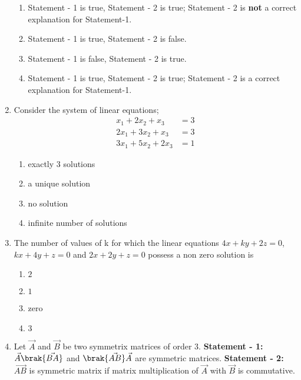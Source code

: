 \begin{enumerate}
	\hfill{}
	\begin{enumerate}
		\item Statement - 1 is true, Statement - 2 is true; Statement - 2 is \textbf{not} a correct explanation for Statement-1. 
	    	\item Statement - 1 is true, Statement - 2 is false. 
	    	\item Statement - 1 is false, Statement - 2 is true.
	    	\item Statement - 1 is true, Statement - 2 is true; Statement - 2 is a correct explanation for Statement-1. 
	\end{enumerate}

    \item Consider the system of linear equations;
	\begin{align*}
		x_1 + 2x_2 + x_3 &= 3\\
		2x_1 + 3x_2 + x_3 &= 3\\
		3x_1 + 5x_2 + 2x_3 &= 1
	\end{align*}
	\hfill{}{\par}
	\begin{enumerate}
		\item exactly $3$ solutions
	    	\item a unique solution
	    	\item no solution
	    	\item infinite number of solutions
	\end{enumerate}

    \item The number of values of k for which the linear equations $4x + ky + 2z = 0$, $kx + 4y + z = 0$ and $2x + 2y + z=0$ possess a non zero solution is 
	\hfill {}{\par}
        \begin{enumerate}
                \item $2$
                \item $1$
                \item zero
                \item $3$
        \end{enumerate}

    \item Let $\vec{A}$ and $\vec{B}$ be two symmetrix matrices of order $3$.
	\newline
	\textbf{Statement - 1:} $\vec{A}\brak{\vec{BA}}$ and $\brak{\vec{AB}}\vec{A}$ are symmetric matrices. 
	\newline
	\textbf{Statement - 2:} $\vec{AB}$ is symmetric matrix if matrix multiplication of $\vec{A}$ with $\vec{B}$ is commutative.


\end{enumerate}
